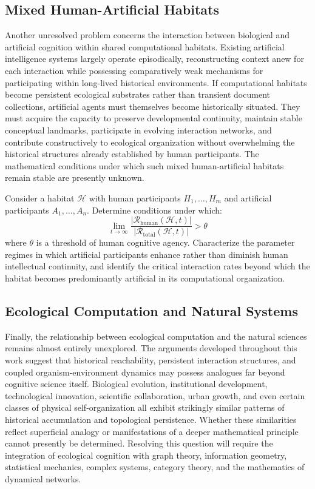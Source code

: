\documentclass[12pt,oneside]{article}
\theoremstyle{remark}
\begin{document}
\subsection{Mixed Human-Artificial Habitats}

Another unresolved problem concerns the interaction between biological and artificial cognition within shared computational habitats. Existing artificial intelligence systems largely operate episodically, reconstructing context anew for each interaction while possessing comparatively weak mechanisms for participating within long-lived historical environments. If computational habitats become persistent ecological substrates rather than transient document collections, artificial agents must themselves become historically situated. They must acquire the capacity to preserve developmental continuity, maintain stable conceptual landmarks, participate in evolving interaction networks, and contribute constructively to ecological organization without overwhelming the historical structures already established by human participants. The mathematical conditions under which such mixed human-artificial habitats remain stable are presently unknown.

\begin{problem}
Consider a habitat \(\mathcal{H}\) with human participants \(H_1, \ldots, H_m\) and artificial participants \(A_1, \ldots, A_n\). Determine conditions under which:
\[
\lim_{t \to \infty} \frac{|\mathcal{R}_{\text{human}}(\mathcal{H}, t)|}{|\mathcal{R}_{\text{total}}(\mathcal{H}, t)|} > \theta
\]
where \(\theta\) is a threshold of human cognitive agency. Characterize the parameter regimes in which artificial participants enhance rather than diminish human intellectual continuity, and identify the critical interaction rates beyond which the habitat becomes predominantly artificial in its computational organization.
\end{problem}

\subsection{Ecological Computation and Natural Systems}

Finally, the relationship between ecological computation and the natural sciences remains almost entirely unexplored. The arguments developed throughout this work suggest that historical reachability, persistent interaction structures, and coupled organism-environment dynamics may possess analogues far beyond cognitive science itself. Biological evolution, institutional development, technological innovation, scientific collaboration, urban growth, and even certain classes of physical self-organization all exhibit strikingly similar patterns of historical accumulation and topological persistence. Whether these similarities reflect superficial analogy or manifestations of a deeper mathematical principle cannot presently be determined. Resolving this question will require the integration of ecological cognition with graph theory, information geometry, statistical mechanics, complex systems, category theory, and the mathematics of dynamical networks.
\end{document}
